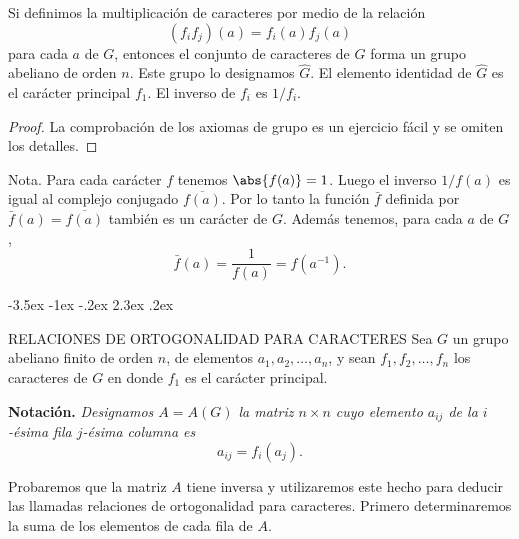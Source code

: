 \documentclass[12pt,a4paper]{book}
\makeatletter
\renewcommand\section{\@startsection{section}{1}{\z@}%
  {-3.5ex \@plus -1ex \@minus -.2ex}%
  {2.3ex \@plus .2ex}%
  {\normalfont\Large\bfseries\raggedright}}
\makeatother
\begin{document}
    \begin{teorema}
        Si definimos la multiplicación de caracteres por medio de la relación
        \begin{equation*}
            (f_{i}f_{j})(a)=f_{i}(a)f_{j}(a)
        \end{equation*}
        para cada $a$ de $G$, entonces el conjunto de caracteres de $G$ forma un grupo
        abeliano de orden $n$. Este grupo lo designamos $\hat{G}$. El elemento identidad de
        $\hat{G}$ es el carácter principal $f_{1}$. El inverso de $f_{i}$ es $1/f_{i}$.
    \end{teorema}

    \begin{proof}
        La comprobación de los axiomas de grupo es un ejercicio fácil y se omiten los
        detalles.
    \end{proof}

    Nota. Para cada carácter $f$ tenemos $\abs{f(a)}=1$. Luego el inverso $1/f(a)$ es igual
    al complejo conjugado $\overline{f(a)}$. Por lo tanto la función $\bar{f}$ definida por
    $\bar{f}(a)=\overline{f(a)}$ también es un carácter de $G$. Además tenemos, para cada
    $a$ de $G$,
    \begin{equation*}
        \bar{f}(a)=\frac{1}{f(a)}=f(a^{-1}).
    \end{equation*}

    \section{RELACIONES DE ORTOGONALIDAD PARA CARACTERES}
    Sea $G$ un grupo abeliano finito de orden $n$, de elementos $a_{1},a_{2},\dots,a_{n}$, y sean
    $f_{1},f_{2},\dots,f_{n}$ los caracteres de $G$ en donde $f_{1}$ es el carácter principal.

    \textbf{Notación.} \textit{Designamos $A=A(G)$ la matriz $n\times n$ cuyo elemento
    $a_{ij}$ de la $i$-ésima fila $j$-ésima columna es}
    \begin{equation*}
        a_{ij}=f_{i}(a_{j}).
    \end{equation*}

    Probaremos que la matriz $A$ tiene inversa y utilizaremos este hecho para deducir las
    llamadas relaciones de ortogonalidad para caracteres. Primero determinaremos la suma de
    los elementos de cada fila de $A$.
\end{document}

